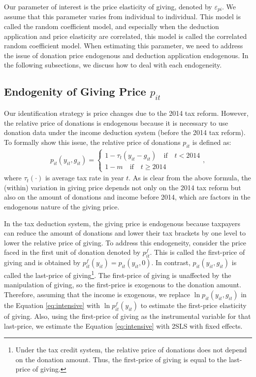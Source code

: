 \documentclass[
  11pt,
  a4paper,
]{article}
\begin{document}
Our parameter of interest is the price elasticity of giving, denoted by \(\varepsilon_{pi}\).
We assume that this parameter varies from individual to individual.
This model is called the random coefficient model,
and especially when the deduction application and price elasticity are correlated,
this model is called the correlated random coefficient model.
When estimating this parameter,
we need to address the issue of donation price endogenous
and deduction application endogenous.
In the following subsections, we discuss how to deal with each endogeneity.

\hypertarget{endogenity-of-giving-price-p_it}{%
\subsection{\texorpdfstring{Endogenity of Giving Price \(p_{it}\)}{Endogenity of Giving Price p\_\{it\}}}\label{endogenity-of-giving-price-p_it}}

Our identification strategy is price changes due to the 2014 tax reform.
However, the relative price of donations is endogenous
because it is necessary to use donation data under the income deduction system (before the 2014 tax reform).
To formally show this issue, the relative price of donations \(p_{it}\) is defined as:
\begin{align}
  p_{it}(y_{it}, g_{it}) =
  \begin{cases}
    1 - \tau_t(y_{it} - g_{it})  \quad\text{if}\quad t < 2014  \\
    1 - m \quad\text{if}\quad t \ge 2014
  \end{cases}, \label{eq:price}
\end{align}
where \(\tau_t(\cdot)\) is average tax rate in year \(t\).
As is clear from the above formula,
the (within) variation in giving price depends not only on the 2014 tax reform
but also on the amount of donations and income before 2014,
which are factors in the endogenous nature of the giving price.

In the tax deduction system,
the giving price is endogenous
because taxpayers can reduce the amount of donations and
lower their tax brackets by one level to lower the relative price of giving.
To address this endogeneity, consider the price faced in the first unit of donation denoted by \(p^f_{it}\).
This is called the first-price of giving and is obtained by \(p^f_{it}(y_{it}) = p_{it}(y_{it}, 0)\).
In contrast, \(p_{it}(y_{it}, g_{it})\) is called the last-price of giving\footnote{Under the tax credit system, the relative price of donations does not depend on the donation amount. Thus, the first-price of giving is equal to the last-price of giving.}.
The first-price of giving is unaffected by the manipulation of giving,
so the first-price is exogenous to the donation amount.
Therefore, assuming that the income is exogenous,
we replace \(\ln p_{it}(y_{it}, g_{it})\) in the Equation \eqref{eq:intensive} with \(\ln p^f_{it}(y_{it})\)
to estimate the first-price elasticity of giving.
Also, using the first-price of giving as the instrumental variable for that last-price,
we estimate the Equation \eqref{eq:intensive} with 2SLS with fixed effects.
\end{document}
